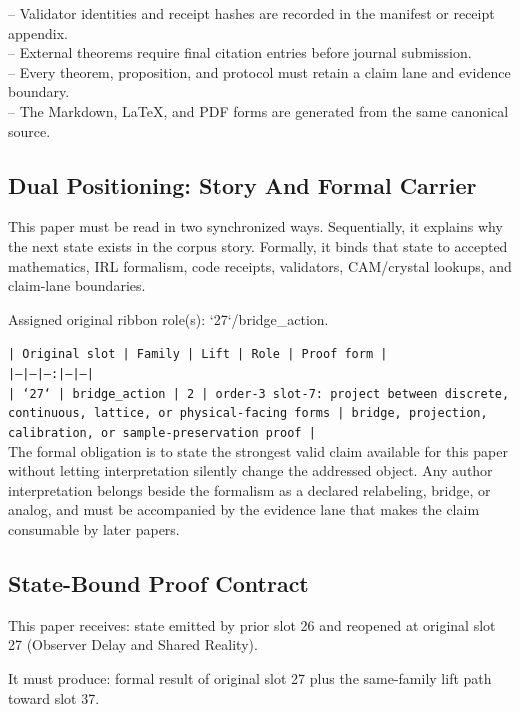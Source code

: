\documentclass[11pt]{article}
\begin{document}
\noindent{}-- Validator identities and receipt hashes are recorded in the manifest or receipt appendix.\\
\noindent{}-- External theorems require final citation entries before journal submission.\\
\noindent{}-- Every theorem, proposition, and protocol must retain a claim lane and evidence boundary.\\
\noindent{}-- The Markdown, LaTeX, and PDF forms are generated from the same canonical source.\\

\subsection*{Dual Positioning: Story And Formal Carrier}

This paper must be read in two synchronized ways. Sequentially, it explains why
the next state exists in the corpus story. Formally, it binds that state to
accepted mathematics, IRL formalism, code receipts, validators, CAM/crystal
lookups, and claim-lane boundaries.

Assigned original ribbon role(s): `27`/bridge\_action.

\noindent\texttt{| Original slot | Family | Lift | Role | Proof form |}\\
\noindent\texttt{|---|---|---:|---|---|}\\
\noindent\texttt{| `27` | bridge\_action | 2 | order-3 slot-7: project between discrete, continuous, lattice, or physical-facing forms | bridge, projection, calibration, or sample-preservation proof |}\\

The formal obligation is to state the strongest valid claim available for this
paper without letting interpretation silently change the addressed object. Any
author interpretation belongs beside the formalism as a declared relabeling,
bridge, or analog, and must be accompanied by the evidence lane that makes the
claim consumable by later papers.

\subsection*{State-Bound Proof Contract}

This paper receives: state emitted by prior slot 26 and reopened at original slot 27 (Observer Delay and Shared Reality).

It must produce: formal result of original slot 27 plus the same-family lift path toward slot 37.
\end{document}
